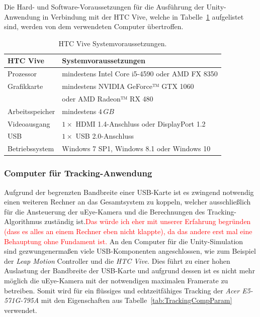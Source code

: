 Die Hard- und Software-Voraussetzungen für die Ausführung der Unity-Anwendung in Verbindung mit der HTC Vive, welche in Tabelle~\ref{tab:viveReq} aufgelistet sind, werden von dem verwendeten Computer übertroffen.

\begin{table}
	\centering
	\begin{tabular}{|l|l|}
		\hline
		\Absatzbox{}
		\textbf{HTC Vive}& \textbf{Systemvoraussetzungen} \\
		\hline
		Prozessor & mindestens Intel Core i5-4590 oder AMD FX 8350\\
		\hline
		Grafikkarte & mindestens NVIDIA GeForce™ GTX 1060\\
		&oder AMD Radeon™ RX 480\\
		\hline
		Arbeitsspeicher & mindestens $4\,GB$\\		
		\hline
		Videoausgang & $1\times$ HDMI 1.4-Anschluss oder DisplayPort 1.2\\
		\hline
		USB & $1\times$ USB 2.0-Anschluss\\
		\hline
		Betriebssystem & Windows 7 SP1, Windows 8.1 oder Windows 10\\
		\hline
	\end{tabular}
	\caption{HTC Vive Systemvoraussetzungen. \cite{website:HTC_Vive_Ready}}
	\label{tab:viveReq}
\end{table}

\subsubsection{Computer für Tracking-Anwendung}\label{sec:TrackingComp}
Aufgrund der begrenzten Bandbreite einer USB-Karte ist es zwingend notwendig einen weiteren Rechner an das Gesamtsystem zu koppeln, welcher ausschließlich für die Ansteuerung der uEye-Kamera und die Berechnungen des Tracking-Algorithmus zuständig ist.\textcolor{red}{Das würde ich eher mit unserer Erfahrung begründen (dass es alles an einem Rechner eben nicht klappte), da das andere erst mal eine Behauptung ohne Fundament ist.}
An den Computer für die Unity-Simulation sind gezwungenermaßen viele USB-Komponenten angeschlossen, wie zum Beispiel der \textit{Leap Motion} Controller und die \textit{HTC Vive}. Dies führt zu einer hohen Auslastung der Bandbreite der USB-Karte und aufgrund dessen ist es nicht mehr möglich die uEye-Kamera mit der notwendigen maximalen Framerate zu betreiben. Somit wird für ein flüssiges und echtzeitfähiges Tracking der \textit{Acer E5-571G-795A} mit den Eigenschaften aus Tabelle~\ref{tab:TrackingCompParam} verwendet.

